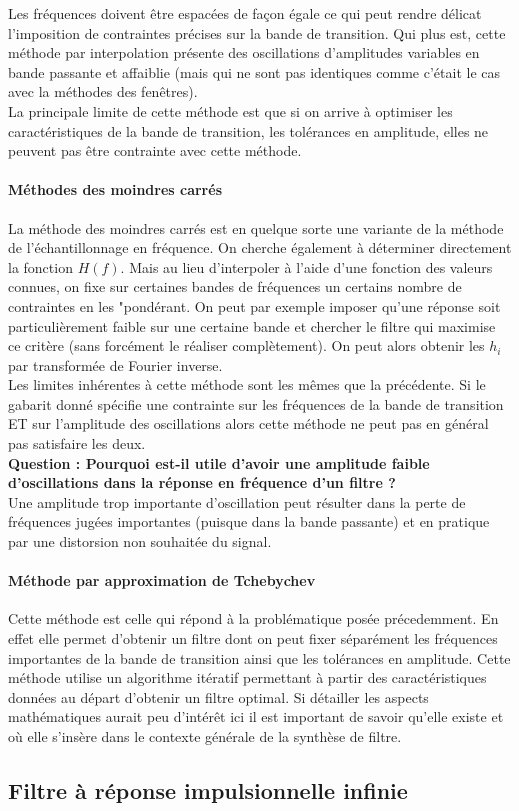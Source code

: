 \documentclass[11pt,a4paper]{article}
\begin{document}
Les fréquences doivent être espacées de façon égale ce qui peut rendre délicat l'imposition de contraintes précises sur la bande de transition. Qui plus est, cette méthode par interpolation présente des oscillations d'amplitudes variables en bande passante et affaiblie (mais qui ne sont pas identiques comme c'était le cas avec la méthodes des fenêtres).\\

La principale limite de cette méthode est que si on arrive à optimiser les caractéristiques de la bande de transition, les tolérances en amplitude, elles ne peuvent pas être contrainte avec cette méthode.\\

\paragraph{Méthodes des moindres carrés}
La méthode des moindres carrés est en quelque sorte une variante de la méthode de l'échantillonnage en fréquence. On cherche également à déterminer directement la fonction $H(f)$. Mais au lieu d'interpoler à l'aide d'une fonction des valeurs connues, on fixe sur certaines bandes de fréquences un certains nombre de contraintes en les "pondérant. On peut par exemple imposer qu'une réponse soit particulièrement faible sur une certaine bande et chercher le filtre qui maximise ce critère (sans forcément le réaliser complètement). On peut alors obtenir les $h_i$ par transformée de Fourier inverse.\\

Les limites inhérentes à cette méthode sont les mêmes que la précédente. Si le gabarit donné spécifie une contrainte sur les fréquences de la bande de transition ET sur l'amplitude des oscillations alors cette méthode ne peut pas en général pas satisfaire les deux.\\

\textbf{Question : Pourquoi est-il utile d'avoir une amplitude faible d'oscillations dans la réponse en fréquence d'un filtre ?}\\

Une amplitude trop importante d'oscillation peut résulter dans la perte de fréquences jugées importantes (puisque dans la bande passante) et en pratique par une distorsion non souhaitée du signal.\\

\paragraph{Méthode par approximation de Tchebychev}
Cette méthode est celle qui répond à la problématique posée précedemment. En effet elle permet d'obtenir un filtre dont on peut fixer séparément les fréquences importantes de la bande de transition ainsi que les tolérances en amplitude. Cette méthode utilise un algorithme itératif permettant à partir des caractéristiques données au départ d'obtenir un filtre optimal. Si détailler les aspects mathématiques aurait peu d'intérêt ici il est important de savoir qu'elle existe et où elle s'insère dans le contexte générale de la synthèse de filtre.\\

 
\subsection{Filtre à réponse impulsionnelle infinie}
\end{document}
